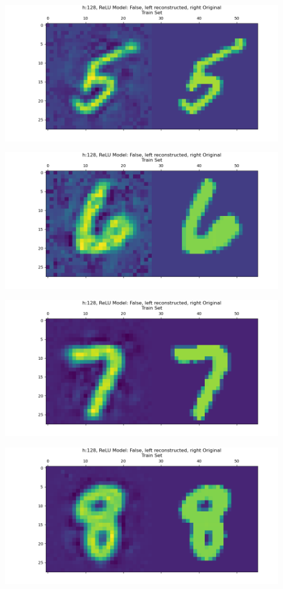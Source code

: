 \documentclass[]{article}
\begin{document}
            \begin{center}
                \includegraphics*[width=12cm]{./A4plots/06-46-48-h-128-lin-digit-5.png}
            \end{center}
            \begin{center}
                \includegraphics*[width=12cm]{./A4plots/06-46-48-h-128-lin-digit-6.png}
            \end{center}
            \begin{center}
                \includegraphics*[width=12cm]{./A4plots/06-46-48-h-128-lin-digit-7.png}
            \end{center}
            \begin{center}
                \includegraphics*[width=12cm]{./A4plots/06-46-49-h-128-lin-digit-8.png}
            \end{center}
\end{document}
